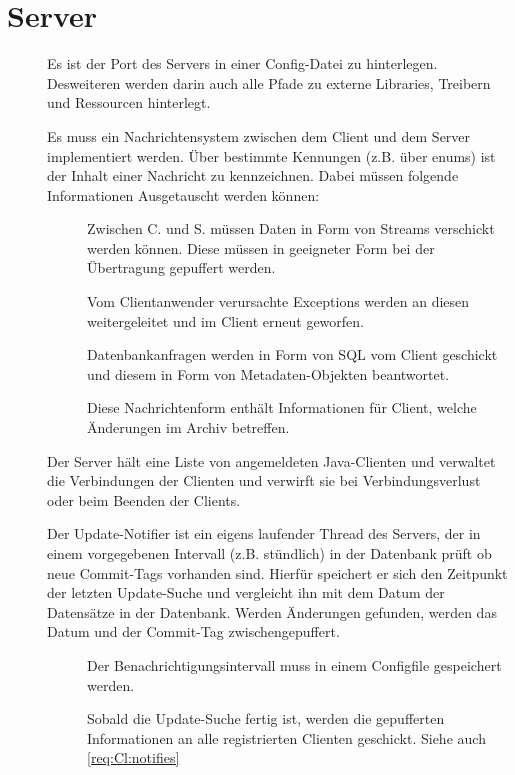 \section{Server} \label{spec:server}
\begin{description}
	\item []
		Es ist der Port des Servers in einer Config-Datei zu hinterlegen.
		Desweiteren werden darin auch alle Pfade zu externe Libraries, Treibern und Ressourcen
		hinterlegt.
	\item []
		Es muss ein Nachrichtensystem zwischen dem Client und dem Server implementiert werden.
		Über bestimmte Kennungen (z.B. über enums) ist der Inhalt einer Nachricht zu kennzeichnen.
		Dabei müssen folgende Informationen Ausgetauscht werden können:
		\begin{description}
	\item []
		Zwischen C. und S. müssen Daten in Form von Streams verschickt werden können.
		Diese müssen in geeigneter Form bei der Übertragung gepuffert werden.
	\item []
		Vom Clientanwender verursachte Exceptions werden an diesen weitergeleitet und 
		im Client erneut geworfen.
	\item []
		Datenbankanfragen werden in Form von SQL vom Client geschickt und diesem
		in Form von Metadaten-Objekten beantwortet.
	\item []
		Diese Nachrichtenform enthält Informationen für Client, welche Änderungen im Archiv betreffen.
\end{description}
	\item []
		Der Server hält eine Liste von angemeldeten Java-Clienten und 
		verwaltet die Verbindungen der Clienten und verwirft sie bei Verbindungsverlust oder 
		beim Beenden der Clients. 
	\item []
		Der Update-Notifier ist ein eigens laufender Thread des Servers, der in einem vorgegebenen Intervall (z.B. stündlich) in der Datenbank prüft ob neue Commit-Tags vorhanden sind.
		Hierfür speichert er sich den Zeitpunkt der letzten Update-Suche und vergleicht ihn mit dem Datum der Datensätze in der Datenbank.
		Werden Änderungen gefunden, werden das Datum und der Commit-Tag zwischengepuffert.
		\begin{description}
			\item []
				Der Benachrichtigungsintervall muss in einem Configfile gespeichert werden.
			\item []
				Sobald die Update-Suche fertig ist, 
				werden die gepufferten Informationen an alle registrierten Clienten geschickt.
				Siehe auch \ref{req:Cl:notifies}
		\end{description}
\end{description}

